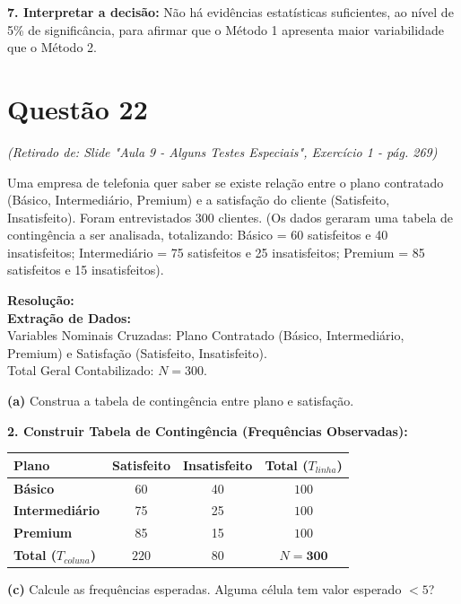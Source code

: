 \documentclass[12pt, a4paper]{article}
\begin{document}
\noindent \textbf{7. Interpretar a decisão:}
Não há evidências estatísticas suficientes, ao nível de 5\% de 
significância, para afirmar que o Método 1 apresenta maior 
variabilidade que o Método 2.

\section*{Questão 22}
\textit{(Retirado de: Slide "Aula 9 - Alguns Testes Especiais", Exercício 1 - pág. 269)}

Uma empresa de telefonia quer saber se existe relação entre o plano contratado (Básico, Intermediário, Premium) e a satisfação do cliente (Satisfeito, Insatisfeito). Foram entrevistados 300 clientes. (Os dados geraram uma tabela de contingência a ser analisada, totalizando: Básico = 60 satisfeitos e 40 insatisfeitos; Intermediário = 75 satisfeitos e 25 insatisfeitos; Premium = 85 satisfeitos e 15 insatisfeitos).

\vspace{0.3cm}
\noindent\textbf{Resolução:}\\
\textbf{Extração de Dados:} \\
Variables Nominais Cruzadas: Plano Contratado (Básico, Intermediário, Premium) e Satisfação (Satisfeito, Insatisfeito). \\
Total Geral Contabilizado: $N = 300$.

\medskip\noindent\textbf{(a)} Construa a tabela de contingência entre plano e satisfação.

\noindent \textbf{2. Construir Tabela de Contingência (Frequências Observadas):}
\begin{table}[h]
\centering
\begin{tabular}{lccc}
\toprule
\textbf{Plano} & \textbf{Satisfeito} & \textbf{Insatisfeito} & \textbf{Total ($T_{linha}$)} \\ \midrule
\textbf{Básico} & 60 & 40 & $100$ \\
\textbf{Intermediário} & 75 & 25 & $100$ \\
\textbf{Premium} & 85 & 15 & $100$ \\ \midrule
\textbf{Total ($T_{coluna}$)} & $220$ & $80$ & $N = \textbf{300}$ \\ \bottomrule
\end{tabular}
\end{table}

\medskip\noindent\textbf{(c)} Calcule as frequências esperadas. Alguma célula tem valor esperado $< 5$?
\end{document}
